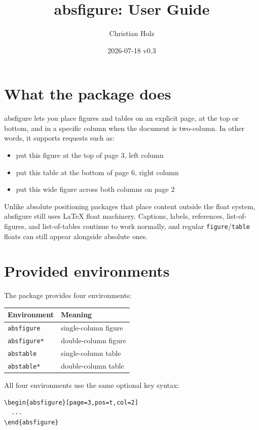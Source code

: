 \documentclass[11pt]{article}
\title{\textsf{absfigure}: User Guide}
\author{Christian Holz}
\date{2026-07-18 v0.3}
\newcommand{\pkg}{\textsf{absfigure}}
\newcommand{\env}[1]{\texttt{#1}}
\begin{document}
\maketitle

\section{What the package does}

\pkg{} lets you place figures and tables on an explicit page, at the top or
bottom, and in a specific column when the document is two-column. In other
words, it supports requests such as:

\begin{itemize}
\item put this figure at the top of page 3, left column
\item put this table at the bottom of page 6, right column
\item put this wide figure across both columns on page 2
\end{itemize}

Unlike absolute positioning packages that place content outside the float
system, \pkg{} still uses \LaTeX{} float machinery. Captions, labels,
references, list-of-figures, and list-of-tables continue to work normally, and
regular \env{figure}/\env{table} floats can still appear alongside absolute
ones.

\section{Provided environments}

The package provides four environments:

\begin{center}
\begin{tabular}{ll}
\toprule
Environment & Meaning \\
\midrule
\env{absfigure} & single-column figure \\
\env{absfigure*} & double-column figure \\
\env{abstable} & single-column table \\
\env{abstable*} & double-column table \\
\bottomrule
\end{tabular}
\end{center}

All four environments use the same optional key syntax:

\begin{verbatim}
\begin{absfigure}[page=3,pos=t,col=2]
  ...
\end{absfigure}
\end{verbatim}
\end{document}
